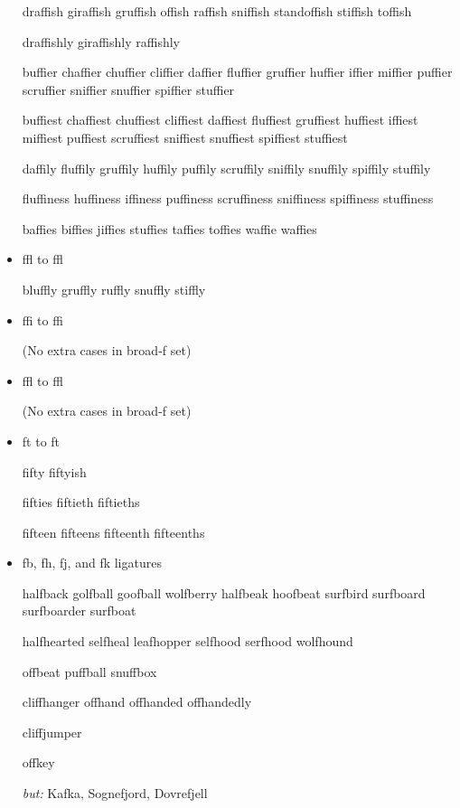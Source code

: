 \begin{itemize}
draffish giraffish gruffish offish raffish sniffish standoffish stiffish toffish

draffishly giraffishly raffishly

buffier chaffier chuffier cliffier daffier fluffier gruffier huffier iffier miffier puffier scruffier sniffier snuffier spiffier stuffier

buffiest chaffiest chuffiest cliffiest daffiest fluffiest gruffiest huffiest iffiest miffiest puffiest scruffiest sniffiest snuffiest spiffiest stuffiest

daffily fluffily gruffily huffily puffily scruffily sniffily snuffily spiffily stuffily

fluffiness huffiness iffiness puffiness scruffiness sniffiness spiffiness stuffiness

baffies biffies jiffies stuffies taffies toffies waffie waffies


\item ffl to ff\hspace{0pt}l

bluffly gruffly ruffly snuffly stiffly


\item ffi to f\hspace{0pt}fi

(No extra cases in broad-f set)


\item ffl to f\hspace{0pt}fl

(No extra cases in broad-f set)


\item ft to f\hspace{0pt}t

fifty fiftyish

fifties fiftieth fiftieths

fifteen fifteens fifteenth fifteenths

\bgroup \ebg
\item fb, fh, fj, and fk ligatures

halfback golfball goofball wolfberry halfbeak hoofbeat surfbird surfboard surfboarder surfboat

halfhearted selfheal leafhopper selfhood serfhood wolfhound

offbeat puffball snuffbox

cliffhanger offhand offhanded offhandedly

cliffjumper

offkey

\emph{but:} Kafka, Sognefjord, Dovrefjell

\egroup



\end{itemize}


